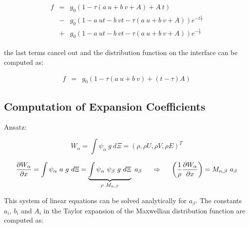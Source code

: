 \documentclass[
	pdftex,             %
	12pt,				%
	a4paper,		   	%
	english,				%
	oneside,			%
]{article}
\begin{document}
\begin{equation}
\begin{split}
\begin{array}{lcll}
f
&=&
g_0 \left( 1 - \tau (a~u + b~v + A) + A~t \right)
\\
&-&
g_0 \left( 1 - a~ut - b~vt - \tau(a~u + b~v + A) \right) e^{-t\tfrac{t}{\tau}}
\\
&+& 
g_0 \left( 1 - a~ut - b~vt - \tau \left( a~u + b~v + A \right) \right) e^{-\tfrac{t}{\tau}}
\end{array}
\end{split}
\end{equation}

the last terms cancel out and the distribution function on the interface can be computed as:

\begin{equation}
\begin{array}{lcl}
f &=& g_0 \left( 1 - \tau (a~u + b~v) + (t-\tau)A \right)
\end{array}
\end{equation}

\clearpage

\subsection*{Computation of Expansion Coefficients}

Ansatz:

\begin{equation}
W_\alpha 
= \int \psi_\alpha~g~d\Xi
= \left( \rho, \rho U, \rho V, \rho E \right)^T 
\end{equation}

\begin{equation}
\dfrac{\partial W_\alpha}{\partial x}
=
\int \psi_\alpha~a~g~d\Xi
=
\underbrace{\int \psi_\alpha~\psi_\beta~g~d\Xi}_{\rho~M_{\alpha,\beta}}~a_\beta
\hspace{0.5cm} \Rightarrow \hspace{0.5cm}
\left( \dfrac{1}{\rho}\dfrac{\partial W_\alpha}{\partial x} \right)
=
M_{\alpha,\beta}~a_\beta
\end{equation}

This system of linear equations can be solved analytically for $a_\beta$. The constants $a_i$, $b_i$ and $A_i$ in the Taylor expansion of the Maxwellian distribution function are computed as:
\end{document}
